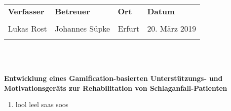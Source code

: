 \documentclass[a4paper, 12pt, titlepage, bibliography=totocnumbered]{scrartcl}
\begin{document}

\begin{tabularx}{\textwidth}{Y|Y|Y|Y}
	\textbf{Verfasser} & \textbf{Betreuer} & \textbf{Ort} & \textbf{Datum}\\
	& & & \\
	Lukas Rost & Johannes Süpke & Erfurt & 20. März 2019 \\
	& & & \\
\end{tabularx} \\
\begin{center}
	\begin{LARGE}
		\textbf{\\ Entwicklung eines Gamification-basierten Unterstützungs- und Motivationsgeräts zur Rehabilitation von Schlaganfall-Patienten \\}
	\end{LARGE}
\end{center}

\begin{enumerate}
	\item lool leel saas soos
\end{enumerate}
\end{document}
